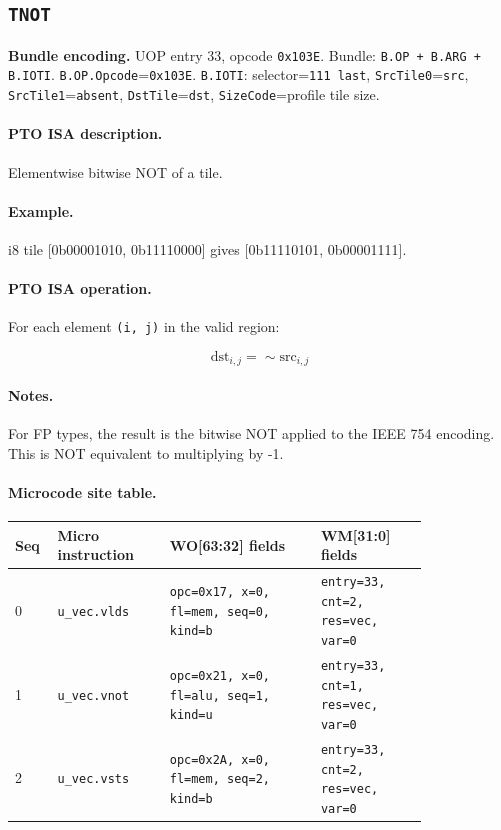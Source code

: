 \subsection{\texttt{TNOT}}
\noindent\textbf{Bundle encoding.} UOP entry 33, opcode \texttt{0x103E}. Bundle: \texttt{B.OP + B.ARG + B.IOTI}. \texttt{B.OP.Opcode}=\texttt{0x103E}. \texttt{B.IOTI}: selector=\texttt{111 last}, \texttt{SrcTile0}=\texttt{src}, \texttt{SrcTile1}=\texttt{absent}, \texttt{DstTile}=\texttt{dst}, \texttt{SizeCode}=profile tile size.\par\smallskip
{\small
\paragraph{PTO ISA description.}
Elementwise bitwise NOT of a tile.
\paragraph{Example.}
i8 tile [0b00001010, 0b11110000] gives [0b11110101, 0b00001111].
\par\smallskip
\paragraph{PTO ISA operation.}
For each element \texttt{(i, j)} in the valid region:

\[
\mathrm{dst}_{i,j} = \sim\mathrm{src}_{i,j}
\]
}\par\smallskip
\paragraph{Notes.}
For FP types, the result is the bitwise NOT applied to the IEEE 754 encoding. This is NOT equivalent to multiplying by -1.
\paragraph{Microcode site table.}
{\scriptsize
\begin{longtable}{@{}R{0.055\linewidth}L{0.23\linewidth}L{0.31\linewidth}L{0.22\linewidth}@{}}
\toprule
Seq & Micro instruction & WO[63:32] fields & WM[31:0] fields \\
 & \texttt{u\_vec.vlds} & \texttt{opc=0x17, x=0, fl=mem, seq=0, kind=b} & \texttt{entry=33, cnt=2, res=vec, var=0} \\
1 & \texttt{u\_vec.vnot} & \texttt{opc=0x21, x=0, fl=alu, seq=1, kind=u} & \texttt{entry=33, cnt=1, res=vec, var=0} \\
2 & \texttt{u\_vec.vsts} & \texttt{opc=0x2A, x=0, fl=mem, seq=2, kind=b} & \texttt{entry=33, cnt=2, res=vec, var=0} \\
\bottomrule
\end{longtable}
}
